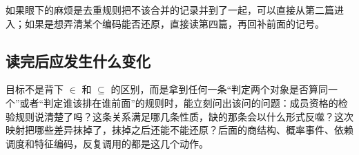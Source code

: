 如果眼下的麻烦是去重规则把不该合并的记录并到了一起，可以直接从第二篇进入；如果是想弄清某个编码能否还原，直接读第四篇，再回补前面的记号。

\subsection{读完后应发生什么变化}

目标不是背下 \(\in\) 和 \(\subseteq\) 的区别，而是拿到任何一条``判定两个对象是否算同一个''或者``判定谁该排在谁前面''的规则时，能立刻问出该问的问题：成员资格的检验规则说清楚了吗？这条关系满足哪几条性质，缺的那条会以什么形式反噬？这次映射把哪些差异抹掉了，抹掉之后还能不能还原？后面的商结构、概率事件、依赖调度和特征编码，反复调用的都是这几个动作。
